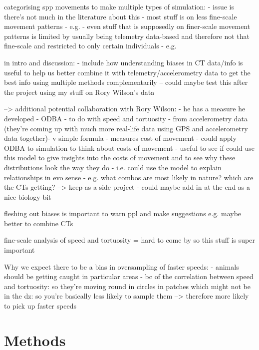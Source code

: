 \documentclass[11pt]{article}
\begin{document}
	
	
	categorising spp movements to make multiple types of simulation:
	- issue is there's not much in the literature about this
	- most stuff is on less fine-scale movement patterns - e.g. \cite{shaw2020causes}
	- even stuff that is supposedly on finer-scale movement patterns is limited by usually being telemetry data-based and therefore not that fine-scale and restricted to only certain individuals 
		- e.g. \cite{leblond2010drives}
	
	
	
	in intro and discussion: 
	- include how understanding biases in CT data/info is useful to help us better combine it with telemetry/accelerometry data to get the best info using multiple methods complementarily
	-- could maybe test this after the project using my stuff on Rory Wilson's data 
	
	--> additional potential collaboration with Rory Wilson:
	- he has a measure he developed - ODBA - to do with speed and tortuosity - from accelerometry data (they're coming up with much more real-life data using GPS and accelerometry data together)- v simple formula
	- measures cost of movement
	- could apply ODBA to simulation to think about costs of movement
	- useful to see if could use this model to give insights into the costs of movement and to see why these distributions look the way they do - i.e. could use the model to explain relationships in evo sense
	- e.g. what combos are most likely in nature? which are the CTs getting?
	--> keep as a side project - could maybe add in at the end as a nice biology bit
	
	
	fleshing out biases is important to warn ppl and make suggestions e.g. maybe better to combine CTs
	
	fine-scale analysis of speed and tortuosity = hard to come by so this stuff is super important
	
	
	
	
	Why we expect there to be a bias in oversampling of faster speeds:
	- animals should be getting caught in particular areas - bc of the correlation between speed and tortuosity: so they're moving round in circles in patches which might not be in the dz: so you're basically less likely to sample them
	--> therefore more likely to pick up faster speeds
	
	
	
	
	
	\section{Methods}
	
\end{document}
